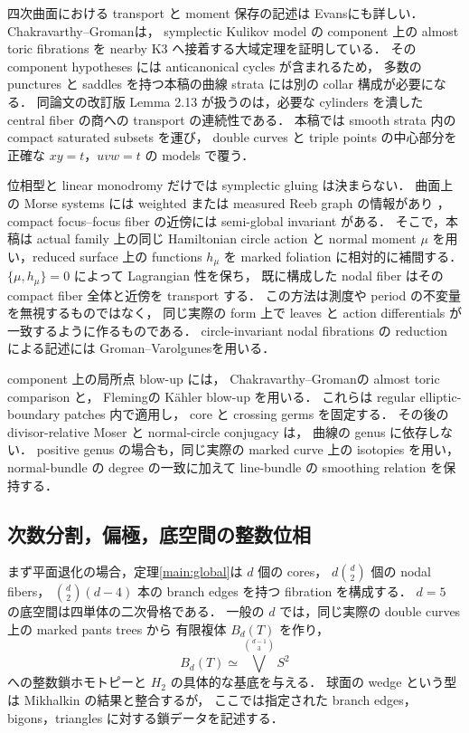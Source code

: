 四次曲面における transport と moment 保存の記述は
Evans\cite[Chapter 6]{EvansNotes}にも詳しい．
Chakravarthy--Groman\cite[Theorem 1.6]{CGK3}は，
symplectic Kulikov model の component 上の almost toric fibrations を
nearby K3 へ接着する大域定理を証明している．
その component hypotheses には anticanonical cycles が含まれるため，
多数の punctures と saddles を持つ本稿の曲線 strata には別の collar 構成が必要になる．
同論文の改訂版 Lemma 2.13 が扱うのは，必要な cylinders を潰した
central fiber の商への transport の連続性である．
本稿では smooth strata 内の compact saturated subsets を運び，
double curves と triple points の中心部分を正確な $xy=t$，$uvw=t$ の models で覆う．

位相型と linear monodromy だけでは symplectic gluing は決まらない．
曲面上の Morse systems には weighted または measured Reeb graph の情報があり
\cite{DMT,IKM}，compact focus--focus fiber の近傍には
semi-global invariant がある\cite[Theorem 2.1]{VuNgoc}．
そこで，本稿は actual family 上の同じ Hamiltonian circle action と
normal moment $\mu$ を用い，reduced surface 上の functions $h_\mu$ を
marked foliation に相対的に補間する．
$\{\mu,h_\mu\}=0$ によって Lagrangian 性を保ち，
既に構成した nodal fiber はその compact fiber 全体と近傍を transport する．
この方法は測度や period の不変量を無視するものではなく，
同じ実際の form 上で leaves と action differentials が一致するように作るものである．
circle-invariant nodal fibrations の reduction による記述には
Groman--Varolgunes\cite[\S7.3]{GV}を用いる．

component 上の局所点 blow-up には，
Chakravarthy--Groman\cite[Theorem 1.1]{CGblowup}の almost toric comparison と，
Fleming\cite[Proposition 4.6, Construction 4.7]{Fleming}の Kähler blow-up を用いる．
これらは regular elliptic-boundary patches 内で適用し，
core と crossing germs を固定する．
その後の divisor-relative Moser と normal-circle conjugacy は，
曲線の genus に依存しない．
positive genus の場合も，同じ実際の marked curve 上の isotopies を用い，
normal-bundle の degree の一致に加えて line-bundle の smoothing relation を保持する．

\subsection{次数分割，偏極，底空間の整数位相}

まず平面退化の場合，定理\ref{main:global}は $d$ 個の cores，
$d\binom d2$ 個の nodal fibers，
$\binom d2(d-4)$ 本の branch edges を持つ fibration を構成する．
$d=5$ の底空間は四単体の二次骨格である．
一般の $d$ では，同じ実際の double curves 上の marked pants trees から
有限複体 $B_d(T)$ を作り，
\[
 B_d(T)\simeq\bigvee^{\binom{d-1}{3}}S^2
\]
への整数鎖ホモトピーと $H_2$ の具体的な基底を与える．
球面の wedge という型は Mikhalkin の結果と整合するが，
ここでは指定された branch edges，bigons，triangles に対する鎖データを記述する．

